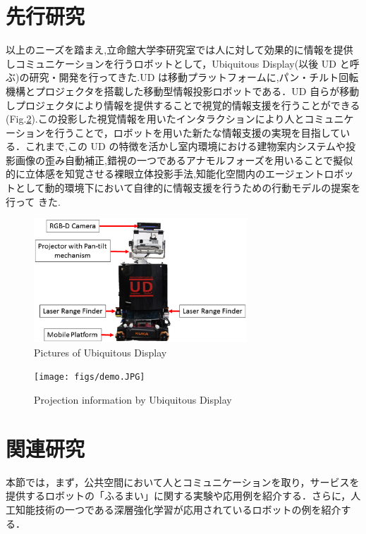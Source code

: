 \documentclass[12pt]{sonota/aislab}
\begin{document}
\section{先行研究}
以上のニーズを踏まえ,立命館大学李研究室では人に対して効果的に情報を提供しコミュニケーションを行うロボットとして，Ubiquitous Display(以後 UD と呼ぶ)の研究・開発を行ってきた\cite{UD1}\cite{UD2}\cite{UD3}\cite{UD4}\cite{UD5}.UD は移動プラットフォームに,パン・チルト回転機構とプロジェクタを搭載した移動型情報投影ロボットである．UD 自らが移動しプロジェクタにより情報を提供することで視覚的情報支援を行うことができる(Fig.\ref{projection}).この投影した視覚情報を用いたインタラクションにより人とコミュニケーションを行うことで，ロボットを用いた新たな情報支援の実現を目指している．これまで,この UD の特徴を活かし室内環境における建物案内システムや投影画像の歪み自動補正,錯視の一つであるアナモルフォーズを用いることで擬似的に立体感を知覚させる裸眼立体投影手法\cite{UD2},知能化空間内のエージェントロボットとして動的環境下において自律的に情報支援を行うための行動モデルの提案\cite{UD5}を行って
きた.

\begin{figure}[t]
\begin{center}
\includegraphics[clip, width=8cm]{figs/ud_with_kinectv2.eps}
\caption{Pictures of Ubiquitous Display}
\label{UD}
\end{center}
\end{figure}

\begin{figure}[t]
\begin{center}
\texttt{[image: figs/demo.JPG]}
\caption{Projection information by Ubiquitous Display}
\label{projection}
\end{center}
\end{figure}

\section{関連研究}
本節では，まず，公共空間において人とコミュニケーションを取り，サービスを提供するロボットの「ふるまい」に関する実験や応用例を紹介する．さらに，人工知能技術の一つである深層強化学習が応用されているロボットの例を紹介する．
\end{document}
